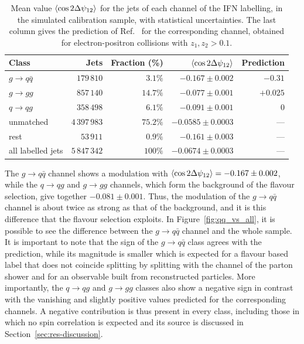 \begin{table}[htbp]
  \centering
  \caption{Mean value $\langle \cos 2\Delta\psi_{12} \rangle$ for the jets of each channel of
  the IFN labelling, in the simulated calibration sample, with statistical
  uncertainties. The last column gives the prediction of
  Ref.~\cite{Karlberg_2021} for the corresponding channel, obtained for
  electron-positron collisions with $z_1, z_2 > 0.1$.}
  \label{tab:cos2-labels}
  \begin{tabular}{lrrrr}
    \toprule
    Class & Jets & Fraction (\%) & $\langle \cos 2\Delta\psi_{12} \rangle$ & Prediction \\
    \midrule
    $g \to q\bar{q}$   & $179\,810$     & $3.1\%$  & $-0.167 \pm 0.002$ & $-0.31$ \\
    $g \to gg$         & $857\,140$     & $14.7\%$ & $-0.077 \pm 0.001$ & $+0.025$ \\
    $q \to qg$         & $358\,498$     & $6.1\%$  & $-0.091 \pm 0.001$ & $0$ \\
    unmatched          & $4\,397\,983$  & $75.2\%$ & $-0.0585 \pm 0.0003$ & --- \\
    rest               & $53\,911$      & $0.9\%$  & $-0.161 \pm 0.003$ & --- \\
    \midrule
    all labelled jets  & $5\,847\,342$  & $100\%$ & $-0.0674 \pm 0.0003$ & ---\\
    \bottomrule
  \end{tabular}
\end{table}

The $g \to q\bar{q}$ channel shows a modulation with $\langle \cos 2\Delta\psi_{12} \rangle = -0.167 \pm 0.002$,
while the $q \to qg$ and $g \to gg$ channels, which form the background of the flavour selection, give
together $-0.081 \pm 0.001$. Thus, the modulation of the $g \to q\bar{q}$ channel is
about twice as strong as that of the background, and it is this
difference that the flavour selection exploits. In Figure~\ref{fig:qq_vs_all}, it is possible to see
the difference between the $g \to q\bar{q}$ channel and the whole sample. It is important 
to note that the sign of the $g \to q\bar{q}$ class agrees with the prediction, while its magnitude
is smaller which is expected for a flavour based label that does not coincide splitting by splitting with the channel
of the parton shower and for an observable built from reconstructed particles. More importantly,
the $q \to qg$ and $g \to gg$ classes also show a negative sign in contrast with 
the vanishing and slightly positive values predicted for the
corresponding channels. A negative contribution is thus present in every class,
including those in which no spin correlation is expected and its source is discussed
in Section~\ref{sec:res-discussion}.

